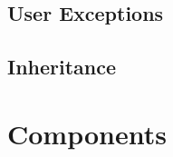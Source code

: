 \subsection{User Exceptions}

\subsection{Inheritance}



\newpage
\section{Components}

\subsection{}


